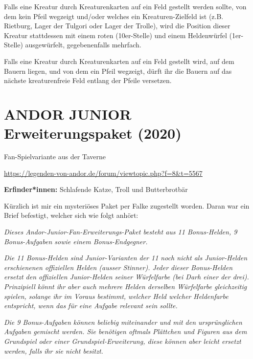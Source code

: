 {Falls eine Kreatur durch Kreaturenkarten auf ein Feld gestellt werden sollte, von dem kein Pfeil wegzeigt und/oder welches ein Kreaturen-Zielfeld ist (z.B. Rietburg, Lager der Tulgori oder Lager der Trolle), wird die Position dieser Kreatur stattdessen mit einem roten (10er-Stelle) und einem Heldenwürfel (1er-Stelle) ausgewürfelt, gegebenenfalls mehrfach.

Falls eine Kreatur durch Kreaturenkarten auf ein Feld gestellt wird, auf dem Bauern liegen, und von dem ein Pfeil wegzeigt, dürft ihr die Bauern auf das nächste kreaturenfreie Feld entlang der Pfeile versetzen.









\newpage
\section{ANDOR JUNIOR Erweiterungspaket (2020)}

\begin{center}
    Fan-Spielvariante aus der Taverne

    \url{https://legenden-von-andor.de/forum/viewtopic.php?f=8&t=5567}
\end{center}


\textbf{Erfinder*innen:} Schlafende Katze, Troll und Butterbrotbär

Kürzlich ist mir ein mysteriöses Paket per Falke zugestellt worden. Daran war ein Brief befestigt, welcher sich wie folgt anhört:

\textit{Dieses Andor-Junior-Fan-Erweiterungs-Paket besteht aus 11 Bonus-Helden, 9 Bonus-Aufgaben sowie einem Bonus-Endgegner.}

\textit{Die 11 Bonus-Helden sind Junior-Varianten der 11 noch nicht als Junior-Helden erschienenen offiziellen Helden (ausser Stinner). Jeder dieser Bonus-Helden ersetzt den offiziellen Junior-Helden seiner Würfelfarbe (bei Darh einer der drei). Prinzipiell könnt ihr aber auch mehrere Helden derselben Würfelfarbe gleichzeitig spielen, solange ihr im Voraus bestimmt, welcher Held welcher Heldenfarbe entspricht, wenn das für eine Aufgabe relevant sein sollte.}

\textit{Die 9 Bonus-Aufgaben können beliebig miteinander und mit den ursprünglichen Aufgaben gemischt werden. Sie benötigen oftmals Plättchen und Figuren aus dem Grundspiel oder einer Grundspiel-Erweiterung, diese können aber leicht ersetzt werden, falls ihr sie nicht besitzt.}

}
